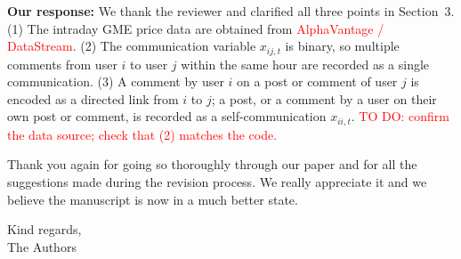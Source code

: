 \documentclass[11pt]{article}
\newcommand{\ourresponse}[1]{\textbf{Our response:} #1}
\begin{document}
\ourresponse{
	We thank the reviewer and clarified all three points in Section~3. (1) The intraday GME price data are obtained from \textcolor{red}{AlphaVantage / DataStream}. (2) The communication variable $x_{ij,t}$ is binary, so multiple comments from user $i$ to user $j$ within the same hour are recorded as a single communication. (3) A comment by user $i$ on a post or comment of user $j$ is encoded as a directed link from $i$ to $j$; a post, or a comment by a user on their own post or comment, is recorded as a self-communication $x_{ii,t}$.
	\textcolor{red}{TO DO: confirm the data source; check that (2) matches the code.}
}

\bigskip\bigskip

Thank you again for going so thoroughly through our paper and for all the suggestions made during the revision process. We really appreciate it and we believe the manuscript is now in a much better state. 

\bigskip
Kind regards,\\
The Authors
\end{document}
